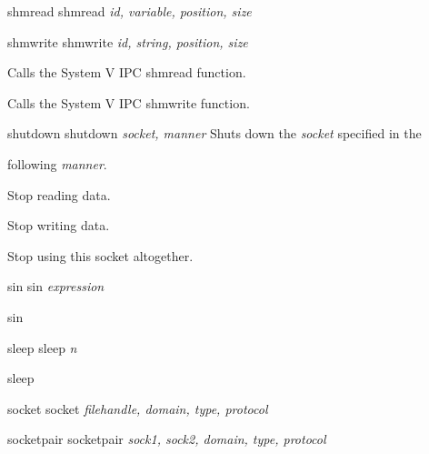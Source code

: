 \documentclass[a4paper,11pt]{book}
\begin{document}
shmread shmread \textit{id, variable, position, size}

\noindent 

\noindent shmwrite shmwrite \textit{id, string, position, size}

\noindent Calls the System V IPC shmread function.

\noindent 

\noindent 

\noindent Calls the System V IPC shmwrite function.

\noindent 

\noindent shutdown shutdown \textit{socket, manner }Shuts down the \textit{socket }specified in the

\noindent following \textit{manner}.

\noindent 

 Stop reading data.

\noindent 

\noindent 

\noindent 

 Stop writing data.

\noindent 

\noindent 

\noindent 

 Stop using this socket altogether.

\noindent 

\noindent 

\noindent 

\noindent 

\noindent sin sin \textit{expression}

\noindent 

\noindent sin

\noindent 

\noindent sleep sleep \textit{n}

\noindent 

\noindent sleep

\noindent 

\noindent socket socket \textit{filehandle, domain, type, protocol}

\noindent 

\noindent 

\noindent 

\noindent socketpair socketpair \textit{sock1, sock2, domain, type, protocol}

\noindent 

\noindent 

\noindent 
\end{document}
